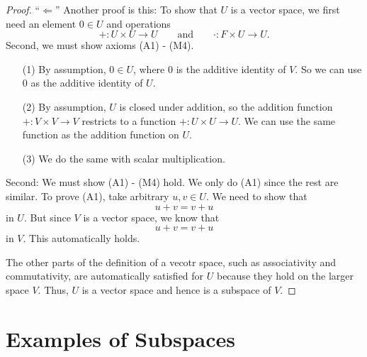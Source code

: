 \documentclass[11pt]{article}
\begin{document}
    \begin{proof}
        ``\(\Leftarrow\)'' Another proof is this: To show that $U$ is a vector space, we first need an element \(0 \in U\) and operations \[+ : U \times U \rightarrow U \qquad \text{and} \qquad \cdot : F \times U \rightarrow U.\] Second, we must show axioms (A1) - (M4).
        \begin{enumerate}
            \item[(1)] By assumption, \(0 \in U\), where 0 is the additive identity of $V$. So we can use 0 as the additive identity of $U$.
            \item[(2)] By assumption, $U$ is closed under addition, so the addition function \(+ : V \times V \rightarrow V\) restricts to a function \(+ : U \times U \rightarrow U.\) We can use the same function as the addition function on $U$. 
            \item[(3)] We do the same with scalar multiplication. 
        \end{enumerate}
        Second: We must show (A1) - (M4) hold. We only do (A1) since the rest are similar. To prove (A1), take arbitrary \(u,v \in U\). We need to show that \[u + v = v + u\] in $U$. But since $V$ is a vector space, we know that \[u + v = v + u\] in $V$. This automatically holds.

        \vspace{1em}

        The other parts of the definition of a vecotr space, such as associativity and commutativity, are automatically satisfied for $U$ because they hold on the larger space $V$. Thus, $U$ is a vector space and hence is a subspace of $V$.
    \end{proof}

    \section{Examples of Subspaces}
\end{document}
